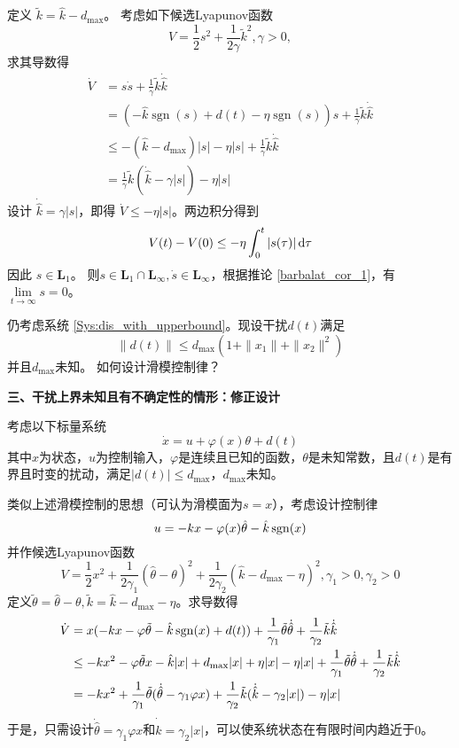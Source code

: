   定义 $\tilde{k} = \hat{k} - d_{\max} $。
  考虑如下候选Lyapunov函数
  \[ V = \frac{1}{2} s^2 + \frac{1}{2 \gamma} \tilde{k}^2, \gamma > 0, \]
  求其导数得
  \begin{align*}
    \dot{V} & = s  \dot{s} + \frac{1}{\gamma} \tilde{k} \dot{\hat{k}}\\
    & = (-\hat{k}\ensuremath{\operatorname{sgn}} (s) + d(t)- \eta \ensuremath{\operatorname{sgn}} (s)) s + \frac{1}{\gamma} \tilde{k}  \dot{\hat{k}}\\
    & \leq - (\hat{k} - d_{\max}) | s | - \eta | s | + \frac{1}{\gamma} \tilde{k}  \dot{\hat{k}}\\
    & = \frac{1}{\gamma} \tilde{k} (\dot{\hat{k}} - \gamma | s |) - \eta | s |
  \end{align*}
  设计 $\dot{\hat{k}} = \gamma | s |$，即得 $\dot{V} \leq - \eta | s |$。两边积分得到
  \[ V (t) - V (0) \leq - \eta \int^t_0 | s(\tau) | \mathop{}\!\mathrm{d} \tau \]
  因此 $s \in \mathbf{L}_1$。
  则$s \in \mathbf{L}_1 \cap \mathbf{L}_{\infty}, \dot{s} \in
  \mathbf{L}_{\infty}$，根据推论 \ref{barbalat_cor_1}，有 $\lim\limits_{t \rightarrow \infty} s = 0$。
\begin{problem}\label{Pro:dis_with_unknown_upperbound}
    仍考虑系统 \eqref{Sys:dis_with_upperbound}。现设干扰$d(t)$满足
  \[ \| d (t) \| \leq d_{\max} (1 + \| x_1 \| + \| x_2 \|^2) \]
并且$d_{\max}$未知。
如何设计滑模控制律？
\end{problem}

\noindent\textbf{三、干扰上界未知且有不确定性的情形：修正设计}

考虑以下标量系统
\begin{equation}
    \dot{x} = u + \varphi(x)\theta + d(t)
\end{equation}
其中$x$为状态，$u$为控制输入，$\varphi$是连续且已知的函数，$\theta$是未知常数，且$d(t)$是有界且时变的扰动，满足$|d(t)|\le d_{\max}$，$d_{\max}$未知。

类似上述滑模控制的思想（可认为滑模面为$s=x$），考虑设计控制律\[u=-kx-\varphi(x)\hat{\theta}-\hat{k}\operatorname{sgn}(x)\]
并作候选Lyapunov函数\[V=\frac{1}{2}x^2+\frac{1}{2\gamma_1}(\hat{\theta}-\theta)^2+\frac{1}{2\gamma_2}(\hat{k}-d_{\max}-\eta)^2,\gamma_1>0,\gamma_2>0\]
定义$\tilde{\theta}=\hat{\theta}-\theta,\tilde{k}=\hat{k}-d_{\max}-\eta$。求导数得
\begin{align*}
    \dot{V}&=x(-kx-\varphi\tilde{\theta}-\hat{k}\operatorname{sgn}(x)+d(t))+\frac{1}{\gamma_1}\tilde{\theta}\dot{\hat{\theta}}+\frac{1}{\gamma_2}\tilde{k}\dot{\hat{k}}\\
    &\leq -kx^2-\varphi\tilde{\theta}x-\hat{k}|x|+d_{\max}|x|+\eta|x|-\eta|x|+\frac{1}{\gamma_1}\tilde{\theta}\dot{\hat{\theta}}+\frac{1}{\gamma_2}\tilde{k}\dot{\hat{k}}\\
    &=-kx^2+\frac{1}{\gamma_1}\tilde{\theta}(\dot{\hat{\theta}}-\gamma_1\varphi x)+\frac{1}{\gamma_2}\tilde{k}(\dot{\hat{k}}-\gamma_2|x|)-\eta|x|
\end{align*}
于是，只需设计$\dot{\hat{\theta}}=\gamma_1\varphi x$和$\dot{\hat{k}}=\gamma_2|x|$，可以使系统状态在有限时间内趋近于$0$。

